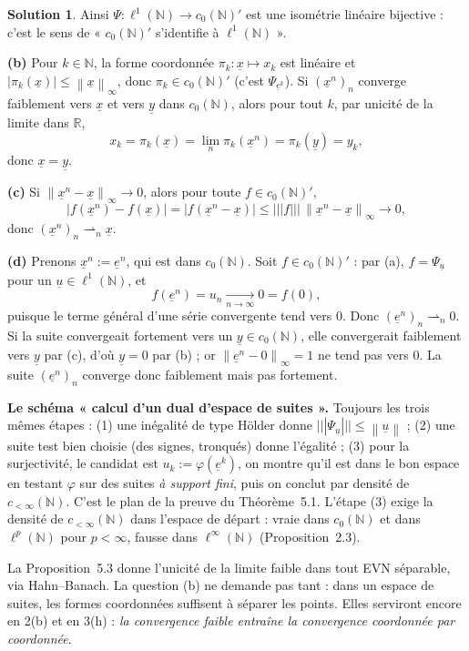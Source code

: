 \documentclass[11pt,a4paper]{article}
\newcommand{\R}{\mathbb{R}}
\newcommand{\N}{\mathbb{N}}
\newcommand{\norm}[1]{\left\|#1\right\|}
\newcommand{\opnorm}[1]{|\!|\!|#1|\!|\!|}
\newcommand{\wk}{\rightharpoonup}
\theoremstyle{definition}
\newtheorem*{solution}{Solution}
\newcommand{\su}[1]{\underline{#1}}
\newcommand{\linf}{\ell^\infty(\N)}
\newcommand{\lun}{\ell^1(\N)}
\newcommand{\cz}{c_0(\N)}
\begin{document}
\begin{solution}
Ainsi $\Psi:\lun\to\cz'$ est une isométrie linéaire bijective : c'est le sens de « $\cz'$ s'identifie à $\lun$ ».

\medskip
\noindent\textbf{(b)} Pour $k\in\N$, la forme coordonnée $\pi_k:\su x\mapsto x_k$ est linéaire et $|\pi_k(\su x)|\le\norm{\su x}_\infty$, donc $\pi_k\in\cz'$ (c'est $\Psi_{\su e^k}$). Si $(\su x^n)_n$ converge faiblement vers $\su x$ et vers $\su y$ dans $\cz$, alors pour tout $k$, par unicité de la limite dans $\R$,
\[
  x_k=\pi_k(\su x)=\lim_n\pi_k(\su x^n)=\pi_k(\su y)=y_k,
\]
donc $\su x=\su y$.

\medskip
\noindent\textbf{(c)} Si $\norm{\su x^n-\su x}_\infty\to0$, alors pour toute $f\in\cz'$,
\[
  |f(\su x^n)-f(\su x)|=|f(\su x^n-\su x)|\le\opnorm f\,\norm{\su x^n-\su x}_\infty\to0,
\]
donc $(\su x^n)_n\wk_n\su x$.

\medskip
\noindent\textbf{(d)} Prenons $\su x^n:=\su e^n$, qui est dans $\cz$. Soit $f\in\cz'$ : par (a), $f=\Psi_{\su u}$ pour un $\su u\in\lun$, et
\[
  f(\su e^n)=u_n\xrightarrow[n\to\infty]{}0=f(0),
\]
puisque le terme général d'une série convergente tend vers $0$. Donc $(\su e^n)_n\wk_n0$. Si la suite convergeait fortement vers un $\su y\in\cz$, elle convergerait faiblement vers $\su y$ par (c), d'où $\su y=0$ par (b) ; or $\norm{\su e^n-0}_\infty=1$ ne tend pas vers $0$. La suite $(\su e^n)_n$ converge donc faiblement mais pas fortement.
\end{solution}

\begin{pointcle}
\textbf{Le schéma « calcul d'un dual d'espace de suites ».} Toujours les trois mêmes étapes : (1) une inégalité de type Hölder donne $\opnorm{\Psi_{\su u}}\le\norm{\su u}$ ; (2) une suite test bien choisie (des signes, tronqués) donne l'égalité ; (3) pour la surjectivité, le candidat est $u_k:=\varphi(\su e^k)$, on montre qu'il est dans le bon espace en testant $\varphi$ sur des suites \emph{à support fini}, puis on conclut par densité de $c_{<\infty}(\N)$. C'est le plan de la preuve du Théorème~5.1. L'étape (3) exige la densité de $c_{<\infty}(\N)$ dans l'espace de départ : vraie dans $\cz$ et dans $\ell^p(\N)$ pour $p<\infty$, fausse dans $\linf$ (Proposition~2.3).
\end{pointcle}

\begin{commentaire}
La Proposition~5.3 donne l'unicité de la limite faible dans tout EVN séparable, via Hahn--Banach. La question (b) ne demande pas tant : dans un espace de suites, les formes coordonnées suffisent à séparer les points. Elles serviront encore en 2(b) et en 3(h) : \emph{la convergence faible entraîne la convergence coordonnée par coordonnée}.
\end{commentaire}
\end{document}

